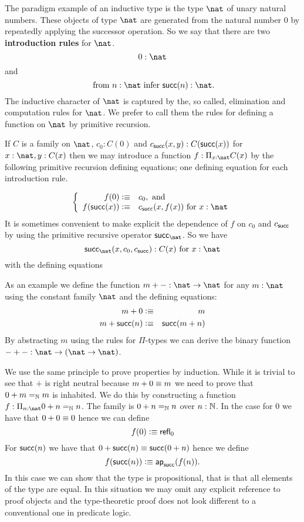 {The paradigm example of an inductive type is the type $\nat$ of unary natural numbers.  These objects of type $\nat$ are generated from the natural number $0$ by repeatedly applying the successor operation.  So we say that there are two {\bf introduction rules} for $\nat$. 
  \[ 0:\nat\]
and
  \[ \mbox{ from $n:\nat$ infer $\suc(n):\nat$}.\]
The inductive character of $\nat$ is captured by the, so called, elimination and computation rules for $\nat$.  We prefer to call them the rules for defining a function on $\nat$ by primitive recursion. 

If $C$ is a family on $\nat$, $c_0:C(0)$ and $c_{\mathsf{succ}}(x,y):C(\mathsf{succ}(x))$ for $x:\nat,y:C(x)$ then we may introduce a function $f:\Pi_{x:\nat}C(x)$ by the following primitive recursion defining equations; one defining equation for each introduction rule.

  \[\left\{\begin{array}{rl}
f(0)\defeq& c_0, \mbox{ and}\\
f(\suc(x))\defeq& c_\suc(x,f(x))\mbox{ for } x:\nat
  \end{array}\right.\]
It is sometimes convenient to make explicit the dependence of $f$ on $c_0$ and $c_{\mathsf{succ}}$ by using the primitive recursive operator $\rec_\nat$.  So we have
  \[ \rec_\nat(x,c_0,c_\suc):C(x)\mbox{ for } x:\nat\]
with the defining equations


As an example we define the function $m + - : \nat \to \nat$ for any
$m : \nat$ using the constant family $\nat$ and the defining
equations:
\begin{eqnarray*}
  m + 0 & \vcentcolon\equiv & m \\
  m + \mathsf{succ}(n) & \vcentcolon\equiv & \mathsf{succ}(m + n)
\end{eqnarray*}
By abstracting $m$ using the rules for $\Pi$-types we can derive the
binary function $- + - : \nat \to (\nat \to \nat)$.

We use the same principle to prove properties by induction. While it
is trivial to see that $+$ is right neutral because $m + 0 \equiv m$
we need to prove that $0 + m =_\mathbb{N} m$ is inhabited. We do this by
constructing a function $f : \Pi_{n : \nat} 0 + n =_\Nat n$. 
The family is $0 + n =_\mathbb{N} n$ over $n : \mathbb{N}$. In the case
for $0$ we have that $0 + 0 \equiv 0$ hence we can define
\[ f(0) \vcentcolon\equiv \mathsf{refl}_{0} \]
For $\mathsf{succ}(n)$ we have that $0 + \mathsf{succ}(n) \equiv \mathsf{succ}(0 +
n)$ hence we define 
\[ f(\mathsf{succ}(n)) \vcentcolon\equiv \mathsf{ap}_{\mathsf{succ}}(f(n)). \]
In this case we can show that the type is propositional, that is that
all elements of the type are equal. In this situation we may omit any
explicit reference to proof objects and the type-theoretic proof does
not look different to a conventional one in predicate logic. 

}

